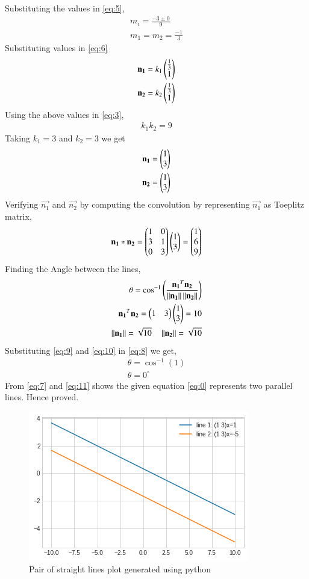 \documentclass[journal,12pt,twocolumn]{IEEEtran}
\begin{document}
Substituting the values in \eqref{eq:5},
\begin{align}
m_i = \frac{-3\pm 0}{9}\\
m_1= m_2 = \frac{-1}{3} \label{eq:7}
\end{align}
Substituting values in \eqref{eq:6}
\begin{align}
\mathbf{n_1}=k_1\begin{pmatrix}\frac{1}{3}\\1\end{pmatrix}\\
\mathbf{n_2}=k_2\begin{pmatrix}\frac{1}{3}\\1\end{pmatrix}
\end{align}
Using the above values in \eqref{eq:3},
\begin{align}
k_1k_2 = 9
\end{align}
Taking $k_1=3$ and $k_2 = 3$ we get
\begin{align}
\mathbf{n_1}=\begin{pmatrix}1\\3\end{pmatrix}\\
\mathbf{n_2}=\begin{pmatrix}1\\3\end{pmatrix}
\end{align}
Verifying $\vec{n_1}$ and $\vec{n_2}$ by computing the convolution by representing $\vec{n_1}$ as Toeplitz matrix,
\begin{align}
\mathbf{n_1}*\mathbf{n_2}=\begin{pmatrix}1&0\\3&1\\0&3\end{pmatrix}\begin{pmatrix}1\\3\end{pmatrix}=\begin{pmatrix}1\\6\\9\end{pmatrix}
\end{align}
Finding the Angle between the lines,
\begin{align}
\theta = \cos^{-1}\left(\frac{\mathbf{n_1}^T\mathbf{n_2}}{\left\lVert\mathbf{n_1}\right\rVert\left\lVert\mathbf{n_2}\right\rVert}\right)\label{eq:8}\\
\mathbf{n_1}^T\mathbf{n_2} = \begin{pmatrix}1&3\end{pmatrix}\begin{pmatrix}1\\3\end{pmatrix} = 10 \label{eq:9}\\
\left\lVert\mathbf{n_1}\right\rVert = \sqrt{10}\quad \left\lVert\mathbf{n_2}\right\rVert=\sqrt{10} \label{eq:10}
\end{align}
Substituting \eqref{eq:9} and \eqref{eq:10} in \eqref{eq:8} we get,
\begin{align}
\theta = \cos^{-1}(1)\\
\theta = 0^{\circ}\label{eq:11}
\end{align}
From \eqref{eq:7} and \eqref{eq:11} shows the given equation \eqref{eq:0} represents two parallel lines. Hence proved.
\begin{figure}[!ht]
\centering
\includegraphics[width=\columnwidth]{Straight_lines.png}
\caption{Pair of straight lines plot generated using python}
\label{fig:plot}
\end{figure}
\end{document}
